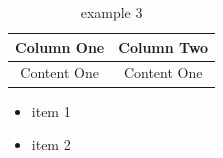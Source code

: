 \documentclass[UTF-8]{ctexart}
\begin{document}
\begin{table}
    \centering
    \begin{tabular}{|c|c|}\hline
        Column One & Column Two \\ \hline
        Content One & Content One\\ \hline
    \end{tabular}
    \caption{example 3}
    \label{example 3}
\end{table}

\begin{itemize}
    \item item 1
    \item item 2
\end{itemize}




\end{document}
